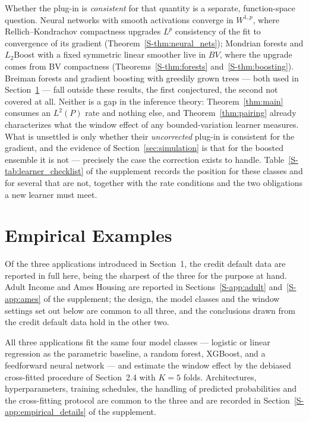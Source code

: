\documentclass[12pt,a4paper]{article}
\numberwithin{equation}{section}
\theoremstyle{plain}
\theoremstyle{definition}
\begin{document}
	Whether the plug-in is \emph{consistent} for that quantity is a separate,
	function-space question. Neural networks with smooth activations converge in
	$W^{1,p}$, where Rellich--Kondrachov compactness upgrades $L^p$ consistency
	of the fit to convergence of its gradient
	(Theorem~\ref{S-thm:neural_nets}); Mondrian forests and $L_2$Boost with a
	fixed symmetric linear smoother live in $BV$, where the upgrade comes from
	BV compactness (Theorems~\ref{S-thm:forests} and~\ref{S-thm:boosting}).
	Breiman forests and gradient boosting with greedily grown trees --- both
	used in Section~\ref{sec:empirical} --- fall outside these results, the
	first conjectured, the second not covered at all. Neither is a gap in the
	inference theory: Theorem~\ref{thm:main} consumes an $L^2(P)$ rate and
	nothing else, and Theorem~\ref{thm:pairing} already characterizes what the
	window effect of any bounded-variation learner measures. What is unsettled
	is only whether their \emph{uncorrected} plug-in is consistent for the
	gradient, and the evidence of Section~\ref{sec:simulation} is that for the
	boosted ensemble it is not --- precisely the case the correction exists to
	handle. Table~\ref{S-tab:learner_checklist} of the supplement records the
	position for these classes and for several that are not, together with the
	rate conditions and the two obligations a new learner must meet.

	\section{Empirical Examples}
	\label{sec:empirical}

	Of the three applications introduced in Section~1, the credit default data
	are reported in full here, being the sharpest of the three for the purpose
	at hand. Adult Income and Ames Housing are reported in
	Sections~\ref{S-app:adult} and~\ref{S-app:ames} of the supplement; the
	design, the model classes and the window settings set out below are common
	to all three, and the conclusions drawn from the credit default data hold in
	the other two.

	All three applications fit the same four model classes --- logistic or linear
	regression as the parametric baseline, a random forest, XGBoost, and a
	feedforward neural network --- and estimate the window effect by the debiased
	cross-fitted procedure of Section~2.4 with $K=5$ folds. Architectures,
	hyperparameters, training schedules, the handling of predicted probabilities
	and the cross-fitting protocol are common to the three and are recorded in
	Section~\ref{S-app:empirical_details} of the supplement.
\end{document}
